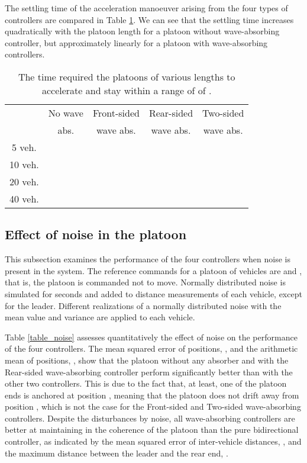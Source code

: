 \documentclass[final,5p,times,twocolumn]{elsarticle}
\begin{document}
The settling time of the acceleration manoeuver arising from the four types of controllers are compared in Table \ref{table_settling_time}. We can see that the settling time increases quadratically with the platoon length for a platoon without wave-absorbing controller, but approximately linearly for a platoon with wave-absorbing controllers.
\begin{table}[!h]
\renewcommand{\arraystretch}{1.1}
\caption{The time required the platoons of various lengths to accelerate and stay within a range of  of .}
\label{table_settling_time}
\centering
\small
\begin{tabular}{|c|c|c|c|c|}
\hline
& No wave &  Front-sided & Rear-sided & Two-sided\\
& abs.& wave abs. & wave abs. & wave abs. \\
\hline
 5 veh. &  &  &  & \\
\hline
 10 veh. &  &  &  & \\
\hline
20 veh. &  &  &  & \\
\hline
 40 veh. &  &  && \\
\hline
\end{tabular}
\end{table}
\normalsize


\subsection{Effect of noise in the platoon}

This subsection examines the performance of the four controllers when noise is present in the system. The reference commands for a platoon of  vehicles are  and , that is, the platoon is commanded not to move. Normally distributed noise is simulated for  seconds and added to distance measurements of each vehicle, except for the leader. Different realizations of a normally distributed noise with the mean value  and variance  are applied to each vehicle.

Table \ref{table_noise} assesses quantitatively the effect of noise on the performance of the four controllers. The mean squared error of positions, , and the arithmetic mean of positions, , show that the platoon without any absorber and with the Rear-sided wave-absorbing controller perform significantly better than with the other two controllers. This is due to the fact that, at least, one of the platoon ends is anchored at position , meaning that the platoon does not drift away from position , which is not the case for the Front-sided and Two-sided wave-absorbing controllers. Despite the disturbances by noise, all wave-absorbing controllers are better at maintaining in the coherence of the platoon than the pure bidirectional controller, as indicated by the mean squared error of inter-vehicle distances, , and the maximum distance between the leader and the rear end, .
\end{document}
